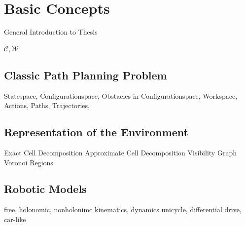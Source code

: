 \chapter{Basic Concepts}\label{ch:introductionplanning}
General Introduction to Thesis

$\mathcal{C,W}$

\section{Classic Path Planning Problem}\label{sec:basic}
Statespace,
Configurationspace,
Obstacles in Configurationspace,
Workspace,
Actions,
Paths,
Trajectories,

\section{Representation of the Environment}\label{sec:representation}
Exact Cell Decomposition
Approximate Cell Decomposition
Visibility Graph
Voronoi Regions

\section{Robotic Models}\label{sec:model}
free, holonomic, nonholonimc
kinematics, dynamics
unicycle, differential drive, car-like 

